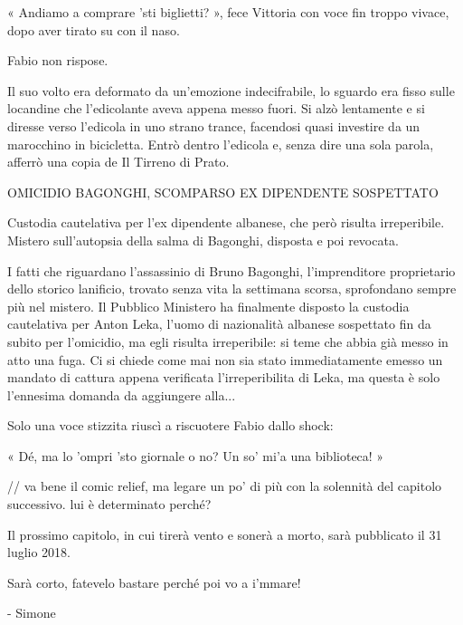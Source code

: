 « Andiamo a comprare 'sti biglietti? », fece Vittoria con voce fin troppo vivace, dopo aver tirato su con il naso.

Fabio non rispose.

Il suo volto era deformato da un'emozione indecifrabile, lo sguardo era fisso sulle locandine che l'edicolante aveva appena messo fuori. Si alzò lentamente e si diresse verso l'edicola in uno strano trance, facendosi quasi investire da un marocchino in bicicletta. Entrò dentro l'edicola e, senza dire una sola parola, afferrò una copia de Il Tirreno di Prato.

OMICIDIO BAGONGHI, SCOMPARSO EX DIPENDENTE SOSPETTATO

Custodia cautelativa per l'ex dipendente albanese, che però risulta irreperibile. Mistero sull'autopsia della salma di Bagonghi, disposta e poi revocata.

I fatti che riguardano l'assassinio di Bruno Bagonghi, l'imprenditore proprietario dello storico lanificio, trovato senza vita la settimana scorsa, sprofondano sempre più nel mistero. Il Pubblico Ministero ha finalmente disposto la custodia cautelativa per Anton Leka, l'uomo di nazionalità albanese sospettato fin da subito per l'omicidio, ma egli risulta irreperibile: si teme che abbia già messo in atto una fuga. Ci si chiede come mai non sia stato immediatamente emesso un mandato di cattura appena verificata l'irreperibilita di Leka, ma questa è solo l'ennesima domanda da aggiungere alla...

Solo una voce stizzita riuscì a riscuotere Fabio dallo shock:

« Dé, ma lo 'ompri 'sto giornale o no? Un so' mi'a una biblioteca! »

// va bene il comic relief, ma legare un po' di più con la solennità del capitolo successivo. lui è determinato perché?

Il prossimo capitolo, in cui tirerà vento e sonerà a morto, sarà pubblicato il 31 luglio 2018.

Sarà corto, fatevelo bastare perché poi vo a i'mmare!

- Simone

